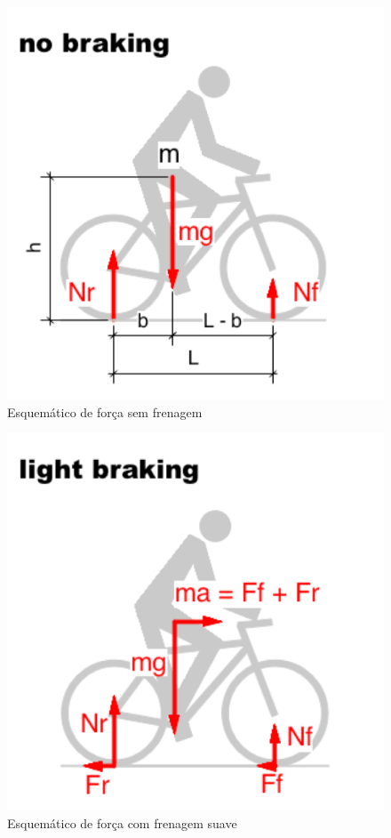 \graphicspath{{figuras/}}
\begin{figure}[h!]
\centering
\includegraphics[scale=0.80]{esq_forca_sem_frenagem.png}
\caption{Esquemático de força sem frenagem}
\label{img:esq_forca_sem_frenagem}
\end{figure}

\graphicspath{{figuras/}}
\begin{figure}[h!]
\centering
\includegraphics[scale=0.80]{esq_forca_com_frenagem_suave.png}
\caption{Esquemático de força com frenagem suave}
\label{img:esq_forca_com_frenagem_suave}
\end{figure}


